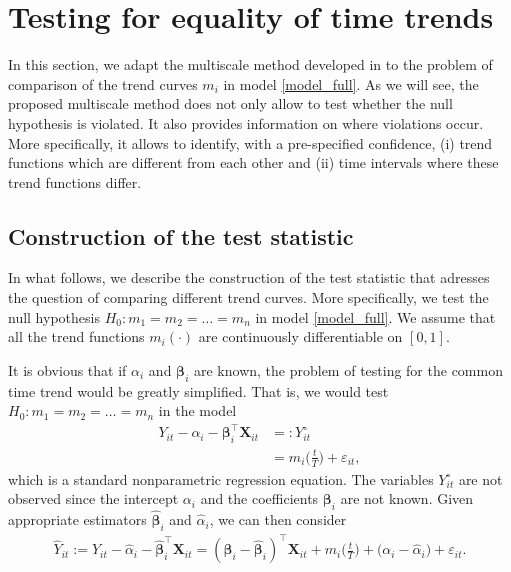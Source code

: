 \documentclass[a4paper,12pt]{article}
\begin{document}
\section{Testing for equality of time trends}\label{sec-test}

In this section, we adapt the multiscale method developed in \cite{KhismatullinaVogt2018} to the problem of comparison of the trend curves $m_i$ in model \eqref{model_full}.  As we will see, the proposed multiscale method does not only allow to test whether the null hypothesis is violated. It also provides information on where violations occur. More specifically, it allows to identify, with a pre-specified confidence, (i) trend functions which are different from each other and (ii) time intervals where these trend functions differ.

\subsection{Construction of the test statistic}\label{subsec-test-stat}

In what follows, we describe the construction of the test statistic that adresses the question of comparing different trend curves. More specifically, we test the null hypothesis $H_0: m_1 = m_2 = \ldots = m_n$ in model \eqref{model_full}. We assume that all the trend functions $m_i(\cdot)$ are continuously differentiable on $[0, 1]$.

It is obvious that if $\alpha_i$ and $\bm{\beta}_i$ are known, the problem of testing for the common time trend would be greatly simplified. That is, we would test $H_0: m_1 = m_2 = \ldots = m_n$ in the model
\begin{align*}
Y_{it} - \alpha_i - \bm{\beta}_i^\top \mathbf{X}_{it} & =: Y_{it}^\circ\\
					& = m_i \Big( \frac{t}{T} \Big) + \varepsilon_{it}, 
\end{align*}
which is a standard nonparametric regression equation. The variables $Y_{it}^\circ$ are not observed since the intercept $\alpha_i$ and the coefficients $\bm{\beta}_i$ are not known. Given appropriate estimators $\widehat{\bm{\beta}}_i$ and $\widehat{\alpha}_i$, we can then consider
\begin{align*}
	\widehat{Y}_{it} := Y_{it} -\widehat{\alpha}_i - \widehat{\bm{\beta}}_i^\top \mathbf{X}_{it} =(\bm{\beta}_i - \widehat{\bm{\beta}}_i)^\top \mathbf{X}_{it} + m_i \Big( \frac{t}{T} \Big) + \big( \alpha_i - \widehat{\alpha}_i \big) + \varepsilon_{it}. 
\end{align*}
\end{document}
